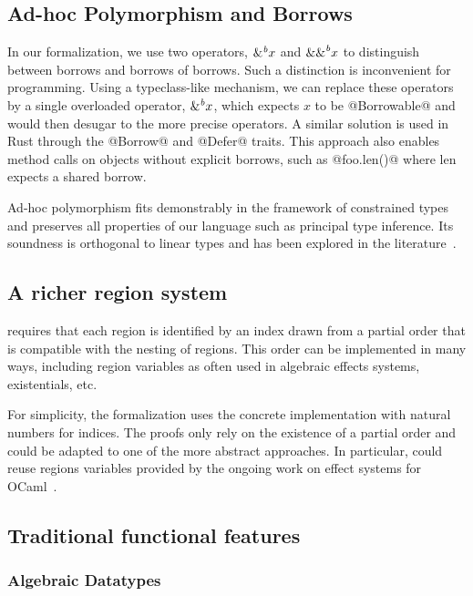 \subsection{Ad-hoc Polymorphism and Borrows}

In our formalization, we use two operators, ${\&}^{\textit{b}}x$ and ${\&\&}^{\textit{b}}x$ to
distinguish between borrows and borrows of borrows.
Such a distinction is inconvenient for programming.
Using a typeclass-like mechanism, we can replace these operators
by a single overloaded operator, ${\&}^{\textit{b}}x$, which expects $x$ to be @Borrowable@ and
would then desugar to the more precise operators.
A similar solution is used in Rust through the @Borrow@ and @Defer@
traits.
This approach also enables method calls on objects without
explicit borrows, such as @foo.len()@ where len expects a shared borrow.

Ad-hoc polymorphism fits demonstrably in the \hmx framework of constrained
types and preserves all properties of our language such
as principal type inference. Its soundness is orthogonal to linear types
and has been explored in the literature~\citep{DBLP:conf/fpca/OderskyWW95}.

\subsection{A richer region system}

\lang requires that each region is identified by an index drawn from a partial
order that is compatible with the nesting of regions.
This order can be implemented in many ways, including region variables
as often used in algebraic effects systems, existentials, etc.

For simplicity, the formalization uses the concrete implementation with 
natural numbers for indices. The proofs only rely on
the existence of a partial order and could be adapted to one of the
more abstract approaches.
In particular, \lang could reuse regions variables provided by
the ongoing work on effect systems
for OCaml~\cite{DBLP:conf/sfp/DolanEHMSW17}.

\subsection{Traditional functional features}

\subsubsection{Algebraic Datatypes}

